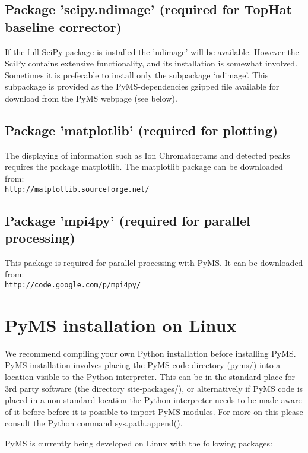 \subsection{\label{subsec:scipy-ndmage}Package 'scipy.ndimage' (required
for TopHat baseline corrector)}

If the full SciPy package is installed the 'ndimage' will be available.
However the SciPy contains extensive functionality, and its installation
is somewhat involved. Sometimes it is preferable to install only the
subpackage `ndimage'. This subpackage is provided as the PyMS-dependencies
gzipped file available for download from the PyMS webpage (see below).

\subsection{\label{subsec:matplotlib}Package 'matplotlib' (required 
for plotting)}

The displaying of information such as Ion Chromatograms and detected
peaks requires the package matplotlib. The matplotlib package can be
downloaded from:\\
{\tt http://matplotlib.sourceforge.net/}

\subsection{\label{subsec:mpi4py}Package 'mpi4py' (required 
for parallel processing)}

This package is required for parallel processing with PyMS. It can be
downloaded from:\\
{\tt http://code.google.com/p/mpi4py/}

\section{PyMS installation on Linux}

We recommend compiling your own Python installation before installing
PyMS. PyMS installation involves placing the PyMS code directory (pyms/)
into a location visible to the Python interpreter. This can be in the
standard place for 3rd party software (the directory site-packages/), or
alternatively if PyMS code is placed in a non-standard location the
Python interpreter needs to be made aware of it before before it is
possible to import PyMS modules. For more on this please consult the
Python command sys.path.append().

PyMS is currently being developed on Linux with the following packages:

